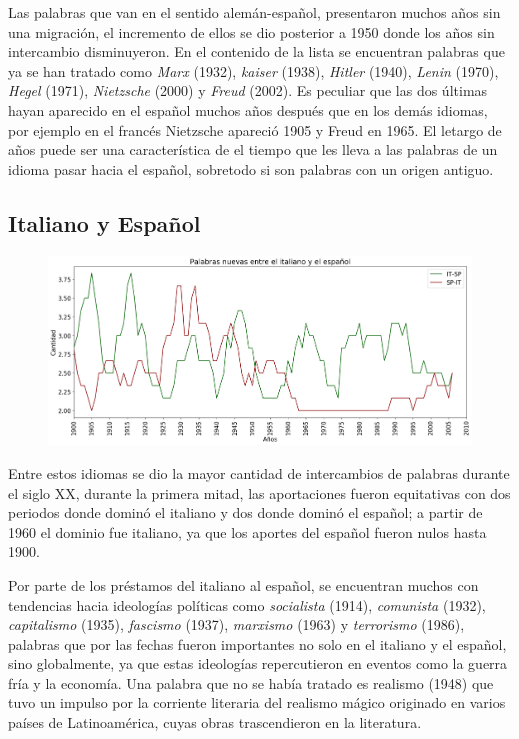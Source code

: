 Las palabras que van en el sentido alemán-español,  presentaron muchos años sin una migración, el incremento de ellos se dio posterior a 1950  donde los años sin intercambio disminuyeron. En el contenido de la lista se encuentran palabras que ya se han tratado como \textit{Marx} (1932), \textit{kaiser} (1938), \textit{Hitler} (1940), \textit{Lenin} (1970), \textit{Hegel} (1971),  \textit{Nietzsche} (2000) y \textit{Freud} (2002).  Es peculiar que las dos últimas hayan aparecido en el español muchos años después que en los demás idiomas, por ejemplo en el francés Nietzsche apareció 1905 y Freud en 1965. El letargo de años puede ser una característica de el tiempo que les lleva  a las  palabras de un idioma  pasar hacia el español,  sobretodo si son palabras con un origen antiguo.

\hfill\break
\subsection{Italiano y Español}

\begin{figure}[h!]
	\centering
	\includegraphics[scale=.38]{Cap_2/NC_4_S2_IT.png}
	\label{NC_IS}
	\caption{}
\end{figure}

Entre estos idiomas se dio la mayor cantidad de intercambios de palabras durante el siglo XX, durante la primera mitad, las aportaciones fueron equitativas con dos periodos donde dominó el italiano y dos donde dominó el español; a partir de 1960 el dominio fue italiano, ya que los aportes del español  fueron nulos hasta 1900. 

Por parte de los préstamos del italiano al español, se encuentran muchos con tendencias hacia ideologías políticas como \textit{socialista} (1914), \textit{comunista} (1932), \textit{capitalismo} (1935), \textit{fascismo} (1937),  \textit{marxismo} (1963) y \textit{terrorismo} (1986), palabras que por las fechas fueron importantes no solo en el italiano y el español, sino globalmente, ya que estas ideologías repercutieron en eventos como la guerra fría y la economía.  Una palabra que no se había tratado es realismo (1948) que tuvo un impulso por la corriente literaria del realismo mágico originado en varios países de Latinoamérica, cuyas obras trascendieron en la literatura. 

